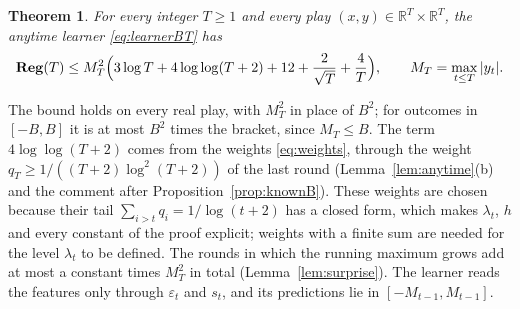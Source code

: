 \documentclass[12pt]{amsart}
\newtheorem{theorem}{Theorem}[section]
\theoremstyle{definition}
\numberwithin{equation}{section}
\newcommand{\R}{\mathbb{R}}
\newcommand{\Reg}{\mathbf{Reg}}
\newcommand{\leanmap}[1]{\ignorespaces}
\newcommand{\mapnote}[1]{\ignorespaces}
\begin{document}
\begin{theorem}\label{thm:unknown}
\leanmap{RegretKappa.UnknownBT.UB.scaleFreeBound_twelve, RegretKappa.UnknownBT.UB.regret_le,
  RegretKappa.UnknownBT.UB.inv_le}
\mapnote{Lean states it as \lname{RegretKappa.UnknownBT.ScaleFreeBound} with the constant $12$, for the learner \lname{RegretKappa.UnknownBT.learnerBT} written out, with rounds indexed from $0$, and $M_T$ as \lname{RegretKappa.UnknownBT.runMax}.}
For every integer $T\ge1$ and every play $(x,y)\in\R^T\times\R^T$, the anytime learner \eqref{eq:learnerBT} has
\[
\Reg(T)\le M_T^2\Bigl(3\log T+4\log\log(T+2)+12+\frac2{\sqrt T}+\frac4T\Bigr),\qquad M_T=\max_{t\le T}|y_t| .
\]
\end{theorem}

The bound holds on every real play, with $M_T^2$ in place of $B^2$; for outcomes in $[-B,B]$ it is at most $B^2$ times the bracket, since $M_T\le B$. The term $4\log\log(T+2)$ comes from the weights \eqref{eq:weights}, through the weight $q_T\ge1/((T+2)\log^2(T+2))$ of the last round (Lemma~\ref{lem:anytime}(b) and the comment after Proposition~\ref{prop:knownB}). These weights are chosen because their tail $\sum_{i>t}q_i=1/\log(t+2)$ has a closed form, which makes $\lambda_t$, $h$ and every constant of the proof explicit; weights with a finite sum are needed for the level $\lambda_t$ to be defined. The rounds in which the running maximum grows add at most a constant times $M_T^2$ in total (Lemma~\ref{lem:surprise}). The learner reads the features only through $\varepsilon_t$ and $s_t$, and its predictions lie in $[-M_{t-1},M_{t-1}]$.
\end{document}
